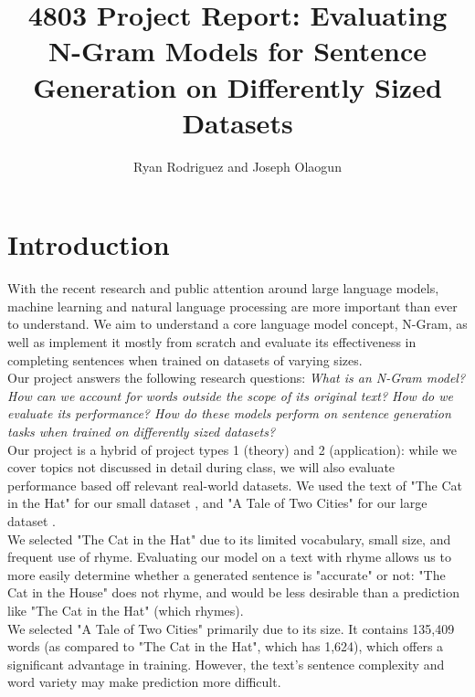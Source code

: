 \documentclass[11pt]{article}
\begin{document}
 
\title{4803 Project Report: Evaluating N-Gram Models for Sentence Generation on Differently Sized Datasets}
\author{Ryan Rodriguez and Joseph Olaogun}

\maketitle

\section{Introduction}

With the recent research and public attention around large language models, machine learning and natural language processing are more important than ever to understand.  We aim to understand a core language model concept, N-Gram, as well as implement it mostly from scratch and evaluate its effectiveness in completing sentences when trained on datasets of varying sizes. \\

Our project answers the following research questions: \textit{What is an N-Gram model?  How can we account for words outside the scope of its original text?  How do we evaluate its performance?  How do these models perform on sentence generation tasks when trained on differently sized datasets?}\\

Our project is a hybrid of project types 1 (theory) and 2 (application): while we cover topics not discussed in detail during class, we will also evaluate performance based off relevant real-world datasets. We used the text of "The Cat in the Hat" for our small dataset \cite{seuss1957cat}, and "A Tale of Two Cities" for our large dataset \cite{pananjady2024just}.\\

We selected "The Cat in the Hat" due to its limited vocabulary, small size, and frequent use of rhyme.  Evaluating our model on a text with rhyme allows us to more easily determine whether a generated sentence is "accurate"
or not: "The Cat in the House" does not rhyme, and would be less desirable than a prediction like "The Cat in the Hat" (which rhymes). \\

We selected "A Tale of Two Cities" primarily due to its size.  It contains 135,409 words (as compared to "The Cat in the Hat", which has 1,624), which offers a significant advantage in training.  However, the text's sentence complexity and word variety may make prediction more difficult.
\end{document}
